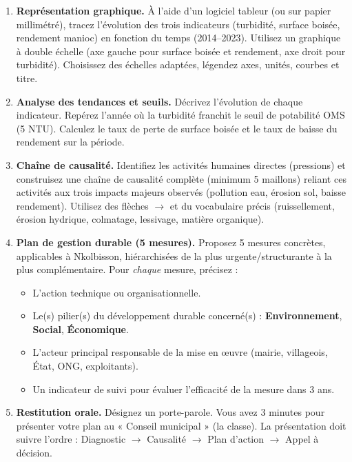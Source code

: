 \documentclass[11pt]{article}
\newcommand{\cle}[1]{{\popxbold\color{popdark}#1}}
\begin{document}
\begin{enumerate}
    \item \textbf{Représentation graphique.} À l'aide d'un logiciel tableur (ou sur papier millimétré), tracez l'évolution des trois indicateurs (turbidité, surface boisée, rendement manioc) en fonction du temps (2014--2023). Utilisez un graphique à double échelle (axe gauche pour surface boisée et rendement, axe droit pour turbidité). Choisissez des échelles adaptées, légendez axes, unités, courbes et titre.
    \item \textbf{Analyse des tendances et seuils.} Décrivez l'évolution de chaque indicateur. Repérez l'année où la turbidité franchit le seuil de potabilité OMS (5 NTU). Calculez le taux de perte de surface boisée et le taux de baisse du rendement sur la période.
    \item \textbf{Chaîne de causalité.} Identifiez les activités humaines directes (pressions) et construisez une chaîne de causalité complète (minimum 5 maillons) reliant ces activités aux trois impacts majeurs observés (pollution eau, érosion sol, baisse rendement). Utilisez des flèches $\rightarrow$ et du vocabulaire précis (ruissellement, érosion hydrique, colmatage, lessivage, matière organique).
    \item \textbf{Plan de gestion durable (5 mesures).} Proposez 5 mesures concrètes, applicables à Nkolbisson, hiérarchisées de la plus urgente/structurante à la plus complémentaire. Pour \emph{chaque} mesure, précisez :
    \begin{itemize}
        \item L'action technique ou organisationnelle.
        \item Le(s) pilier(s) du \cle{développement durable} concerné(s) : \textbf{Environnement}, \textbf{Social}, \textbf{Économique}.
        \item L'acteur principal responsable de la mise en œuvre (mairie, villageois, État, ONG, exploitants).
        \item Un indicateur de suivi pour évaluer l'efficacité de la mesure dans 3 ans.
    \end{itemize}
    \item \textbf{Restitution orale.} Désignez un porte-parole. Vous avez 3 minutes pour présenter votre plan au « Conseil municipal » (la classe). La présentation doit suivre l'ordre : Diagnostic $\rightarrow$ Causalité $\rightarrow$ Plan d'action $\rightarrow$ Appel à décision.
\end{enumerate}
\end{document}
